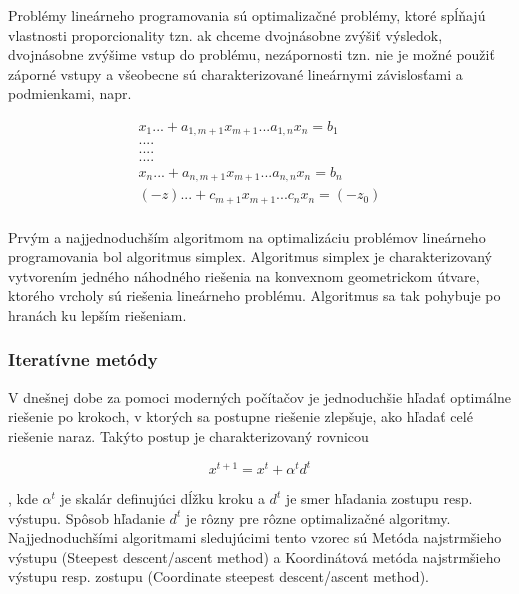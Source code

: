 Problémy lineárneho programovania sú optimalizačné problémy, ktoré spĺňajú vlastnosti proporcionality tzn. ak chceme dvojnásobne zvýšiť výsledok, dvojnásobne zvýšime vstup do problému, nezápornosti tzn. nie je možné použiť záporné vstupy a všeobecne sú charakterizované lineárnymi závislosťami a podmienkami, napr.

\begin{equation}
    \begin{split}
    x_1 ... + a_{1,m+1}x_{m+1} ... a_{1,n}x_{n} = b_1\\
    .               .                   .           .\\
    .               .                   .           .\\
    .               .                   .           .\\
    x_n ... + a_{n,m+1}x_{m+1} ... a_{n,n}x_{n} = b_n\\
    (-z) ... + c_{m+1}x_{m+1} ...  c_{n}x_{n} = (-z_0)\\
    \end{split}
\end{equation}

Prvým a najjednoduchším algoritmom na optimalizáciu problémov lineárneho programovania bol algoritmus simplex.\newline
Algoritmus simplex je charakterizovaný vytvorením jedného náhodného riešenia na konvexnom geometrickom útvare, ktorého vrcholy sú riešenia lineárneho problému. Algoritmus sa tak pohybuje po hranách ku lepším riešeniam.
\cite{5}

\subsubsection{Iteratívne metódy}

V dnešnej dobe za pomoci moderných počítačov je jednoduchšie hľadať optimálne riešenie po krokoch, v ktorých sa postupne riešenie zlepšuje, ako hľadať celé riešenie naraz. Takýto postup je charakterizovaný rovnicou

\begin{equation}\label{iteratívný vzorec}
    x^{t+1} = x^t + \alpha^td^t
\end{equation}

, kde \(\alpha^t\) je skalár definujúci dĺžku kroku a \(d^t\) je smer hľadania zostupu resp. výstupu. Spôsob hľadanie \(d^t\) je rôzny pre rôzne optimalizačné algoritmy.\cite{3} Najjednoduchšími algoritmami sledujúcimi tento vzorec sú Metóda najstrmšieho výstupu (Steepest descent/ascent method) a Koordinátová metóda najstrmšieho výstupu resp. zostupu (Coordinate steepest descent/ascent method).

